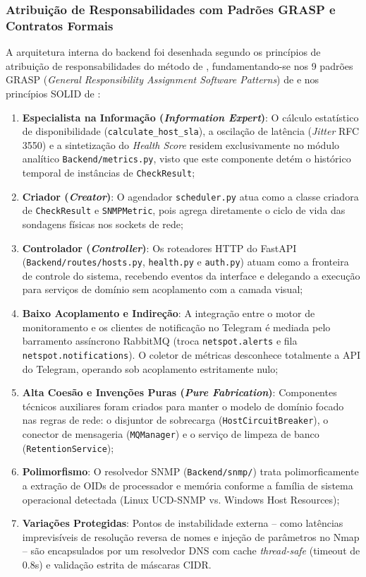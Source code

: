\documentclass[12pt,a4paper]{article}
\begin{document}
\subsubsection{Atribuição de Responsabilidades com Padrões GRASP e Contratos Formais}
A arquitetura interna do backend foi desenhada segundo os princípios de atribuição de responsabilidades do método de , fundamentando-se nos 9 padrões GRASP (\textit{General Responsibility Assignment Software Patterns}) de  e nos princípios SOLID de :
\begin{enumerate}[leftmargin=1.25cm]
\item \textbf{Especialista na Informação (\textit{Information Expert})}: O cálculo estatístico de disponibilidade (\texttt{calculate\_host\_sla}), a oscilação de latência (\textit{Jitter} RFC 3550) e a sintetização do \textit{Health Score} residem exclusivamente no módulo analítico \texttt{Backend/metrics.py}, visto que este componente detém o histórico temporal de instâncias de \texttt{CheckResult};
\item \textbf{Criador (\textit{Creator})}: O agendador \texttt{scheduler.py} atua como a classe criadora de \texttt{CheckResult} e \texttt{SNMPMetric}, pois agrega diretamente o ciclo de vida das sondagens físicas nos sockets de rede;
\item \textbf{Controlador (\textit{Controller})}: Os roteadores HTTP do FastAPI (\texttt{Backend/routes/hosts.py}, \texttt{health.py} e \texttt{auth.py}) atuam como a fronteira de controle do sistema, recebendo eventos da interface e delegando a execução para serviços de domínio sem acoplamento com a camada visual;
\item \textbf{Baixo Acoplamento e Indireção}: A integração entre o motor de monitoramento e os clientes de notificação no Telegram é mediada pelo barramento assíncrono RabbitMQ (troca \texttt{netspot.alerts} e fila \texttt{netspot.notifications}). O coletor de métricas desconhece totalmente a API do Telegram, operando sob acoplamento estritamente nulo;
\item \textbf{Alta Coesão e Invenções Puras (\textit{Pure Fabrication})}: Componentes técnicos auxiliares foram criados para manter o modelo de domínio focado nas regras de rede: o disjuntor de sobrecarga (\texttt{HostCircuitBreaker}), o conector de mensageria (\texttt{MQManager}) e o serviço de limpeza de banco (\texttt{RetentionService});
\item \textbf{Polimorfismo}: O resolvedor SNMP (\texttt{Backend/snmp/}) trata polimorficamente a extração de OIDs de processador e memória conforme a família de sistema operacional detectada (Linux UCD-SNMP vs. Windows Host Resources);
\item \textbf{Variações Protegidas}: Pontos de instabilidade externa -- como latências imprevisíveis de resolução reversa de nomes e injeção de parâmetros no Nmap -- são encapsulados por um resolvedor DNS com cache \textit{thread-safe} (timeout de 0.8s) e validação estrita de máscaras CIDR.
\end{enumerate}
\end{document}

